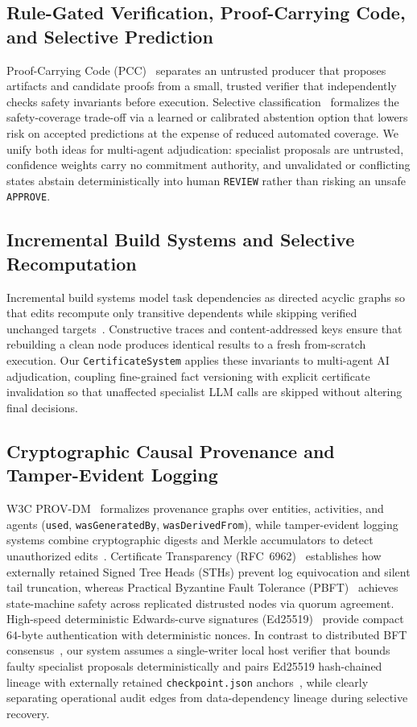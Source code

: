 \documentclass[11pt,a4paper]{article}
\begin{document}
\subsection{Rule-Gated Verification, Proof-Carrying Code, and Selective Prediction}
Proof-Carrying Code (PCC)~\citep{necula1997pcc} separates an untrusted producer that proposes artifacts and candidate proofs from a small, trusted verifier that independently checks safety invariants before execution. Selective classification~\citep{geifman2017selective} formalizes the safety-coverage trade-off via a learned or calibrated abstention option that lowers risk on accepted predictions at the expense of reduced automated coverage. We unify both ideas for multi-agent adjudication: specialist proposals are untrusted, confidence weights carry no commitment authority, and unvalidated or conflicting states abstain deterministically into human \texttt{REVIEW} rather than risking an unsafe \texttt{APPROVE}.

\subsection{Incremental Build Systems and Selective Recomputation}
Incremental build systems model task dependencies as directed acyclic graphs so that edits recompute only transitive dependents while skipping verified unchanged targets~\citep{mokhov2018build}. Constructive traces and content-addressed keys ensure that rebuilding a clean node produces identical results to a fresh from-scratch execution. Our \texttt{CertificateSystem} applies these invariants to multi-agent AI adjudication, coupling fine-grained fact versioning with explicit certificate invalidation so that unaffected specialist LLM calls are skipped without altering final decisions.

\subsection{Cryptographic Causal Provenance and Tamper-Evident Logging}
W3C PROV-DM~\citep{moreau2013prov} formalizes provenance graphs over entities, activities, and agents (\texttt{used}, \texttt{wasGeneratedBy}, \texttt{wasDerivedFrom}), while tamper-evident logging systems combine cryptographic digests and Merkle accumulators to detect unauthorized edits~\citep{crosby2009tamper}. Certificate Transparency (RFC~6962)~\citep{laurie2013rfc6962} establishes how externally retained Signed Tree Heads (STHs) prevent log equivocation and silent tail truncation, whereas Practical Byzantine Fault Tolerance (PBFT)~\citep{castro1999pbft} achieves state-machine safety across replicated distrusted nodes via quorum agreement. High-speed deterministic Edwards-curve signatures (Ed25519)~\citep{bernstein2012ed25519,josefsson2017rfc8032} provide compact $64$-byte authentication with deterministic nonces. In contrast to distributed BFT consensus~\citep{castro1999pbft}, our system assumes a single-writer local host verifier that bounds faulty specialist proposals deterministically and pairs Ed25519 hash-chained lineage with externally retained \texttt{checkpoint.json} anchors~\citep{crosby2009tamper,laurie2013rfc6962}, while clearly separating operational audit edges from data-dependency lineage during selective recovery.
\end{document}
